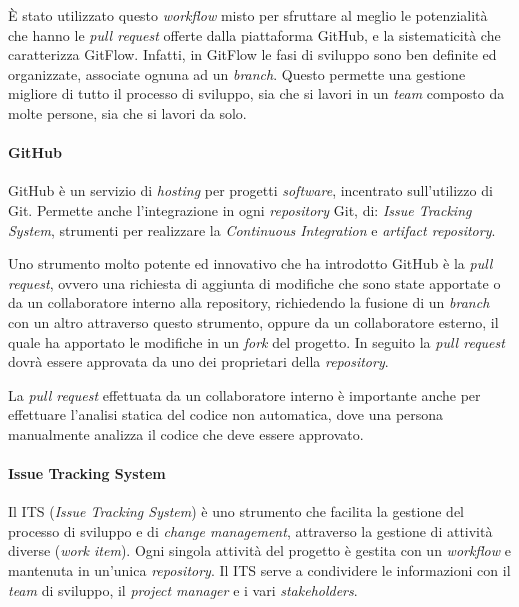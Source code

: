 È stato utilizzato questo \textit{workflow} misto per sfruttare al meglio le potenzialità che hanno le \textit{pull request} offerte dalla piattaforma GitHub, e la sistematicità che caratterizza GitFlow. Infatti, in GitFlow le fasi di sviluppo sono ben definite ed organizzate, associate ognuna ad un \textit{branch}. Questo permette una gestione migliore di tutto il processo di sviluppo, sia che si lavori in un \textit{team} composto da molte persone, sia che si lavori da solo.

\paragraph{GitHub}
GitHub è un servizio di \textit{hosting} per progetti \textit{software}, incentrato sull'utilizzo di Git. Permette anche l'integrazione in ogni \textit{repository} Git, di: \textit{Issue Tracking System}, strumenti per realizzare la \textit{Continuous Integration} e \textit{artifact repository}. 

Uno strumento molto potente ed innovativo che ha introdotto GitHub è la \textit{pull request}, ovvero una richiesta di aggiunta di modifiche che sono state apportate o da un collaboratore interno alla repository, richiedendo la fusione di un \textit{branch} con un altro attraverso questo strumento, oppure da un collaboratore esterno, il quale ha apportato le modifiche in un \textit{fork} del progetto. In seguito la \textit{pull request} dovrà essere approvata da uno dei proprietari della \textit{repository}. 

La \textit{pull request} effettuata da un collaboratore interno è importante anche per effettuare l'analisi statica del codice non automatica, dove una persona manualmente analizza il codice che deve essere approvato.

\paragraph{Issue Tracking System}
Il ITS (\textit{Issue Tracking System}) è uno strumento che facilita la gestione del processo di sviluppo e di \textit{change management}, attraverso la gestione di attività diverse (\textit{work item}). Ogni singola attività del progetto è gestita con un \textit{workflow} e mantenuta in un'unica \textit{repository}. Il ITS serve a condividere le informazioni con il \textit{team} di sviluppo, il \textit{project manager} e i vari \textit{stakeholders}. \\

